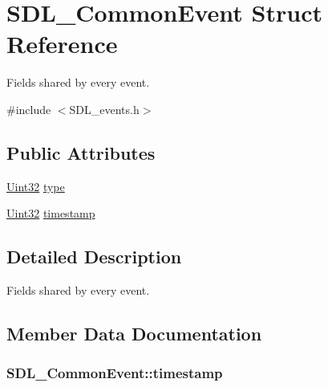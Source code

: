 \hypertarget{struct_s_d_l___common_event}{}\section{S\+D\+L\+\_\+\+Common\+Event Struct Reference}
\label{struct_s_d_l___common_event}


Fields shared by every event.  




{\ttfamily \#include $<$S\+D\+L\+\_\+events.\+h$>$}

\subsection*{Public Attributes}
\begin{DoxyCompactItemize}
\item 
\hyperlink{_s_d_l__stdinc_8h_add440eff171ea5f55cb00c4a9ab8672d}{Uint32} \hyperlink{struct_s_d_l___common_event_a4ecd888325355321b42b2e2956f27453}{type}
\item 
\hyperlink{_s_d_l__stdinc_8h_add440eff171ea5f55cb00c4a9ab8672d}{Uint32} \hyperlink{struct_s_d_l___common_event_a7d9046abb021ffc88dd5d32978289e65}{timestamp}
\end{DoxyCompactItemize}


\subsection{Detailed Description}
Fields shared by every event. 

\subsection{Member Data Documentation}
\subsubsection[{\texorpdfstring{timestamp}{timestamp}}]{ S\+D\+L\+\_\+\+Common\+Event\+::timestamp}\hypertarget{struct_s_d_l___common_event_a7d9046abb021ffc88dd5d32978289e65}{}\label{struct_s_d_l___common_event_a7d9046abb021ffc88dd5d32978289e65}
